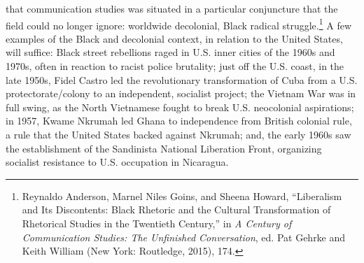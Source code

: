 \documentclass{tufte-handout}
\begin{document}
\noindent that communication studies was situated in a particular
conjuncture that the field could no longer ignore: worldwide decolonial,
Black radical struggle.\footnote{Reynaldo Anderson, Marnel Niles Goins, and Sheena Howard, ``Liberalism
  and Its Discontents: Black Rhetoric and the Cultural Transformation of
  Rhetorical Studies in the Twentieth Century,'' in \emph{A Century of
  Communication Studies: The Unfinished Conversation}, ed. Pat Gehrke
  and Keith William (New York: Routledge, 2015), 174.
} A few
examples of the Black and decolonial context, in relation to the United
States, will suffice: Black street rebellions raged in U.S. inner cities
of the 1960s and 1970s, often in reaction to racist police brutality;
just off the U.S. coast, in the late 1950s, Fidel Castro led the
revolutionary transformation of Cuba from a U.S. protectorate/colony to
an independent, socialist project; the Vietnam War was in full swing, as
the North Vietnamese fought to break U.S. neocolonial aspirations; in
1957, Kwame Nkrumah led Ghana to independence from British colonial
rule, a rule that the United States backed against Nkrumah; and, the
early 1960s saw the establishment of the Sandinista National Liberation
Front, organizing socialist resistance to U.S. occupation in Nicaragua.
\end{document}

